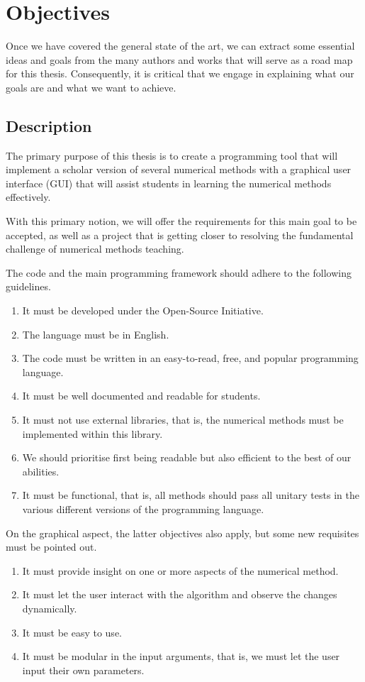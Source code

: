 \chapter{Objectives}
Once we have covered the general state of the art, we can extract some essential ideas and goals from the many authors and works that will serve as a road map for this thesis. Consequently, it is critical that we engage in explaining what our goals are and what we want to achieve.

\section{Description}
The primary purpose of this thesis is to create a programming tool that will implement a scholar version of several numerical methods with a graphical user interface (GUI) that will assist students in learning the numerical methods effectively.

With this primary notion, we will offer the requirements for this main goal to be accepted, as well as a project that is getting closer to resolving the fundamental challenge of numerical methods teaching.

The code and the main programming framework should adhere to the following guidelines.
\begin{enumerate}
    \item It must be developed under the Open-Source Initiative.
    \item The language must be in English.
    \item The code must be written in an easy-to-read, free, and popular programming language.
    \item It must be well documented and readable for students.
    \item It must not use external libraries, that is, the numerical methods must be implemented within this library.
    \item We should prioritise first being readable but also efficient to the best of our abilities.
    \item It must be functional, that is, all methods should pass all unitary tests in the various different versions of the programming language.
\end{enumerate}

On the graphical aspect, the latter objectives also apply, but some new requisites must be pointed out.
\begin{enumerate}
    \item It must provide insight on one or more aspects of the numerical method.
    \item It must let the user interact with the algorithm and observe the changes dynamically.
    \item It must be easy to use.
    \item It must be modular in the input arguments, that is, we must let the user input their own parameters.
\end{enumerate}

